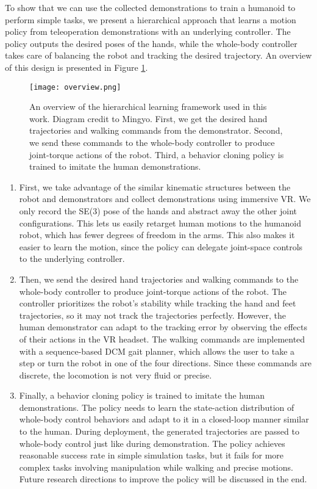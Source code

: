 To show that we can use the collected demonstrations to train a humanoid to perform simple tasks, we present a hierarchical approach that learns a motion policy from teleoperation demonstrations with an underlying controller. The policy outputs the desired poses of the hands, while the whole-body controller takes care of balancing the robot and tracking the desired trajectory. An overview of this design is presented in Figure \ref{fig:overview}.
\begin{figure}
    \centering
    \texttt{[image: overview.png]}
    \caption{An overview of the hierarchical learning framework used in this work. Diagram credit to Mingyo. First, we get the desired hand trajectories and walking commands from the demonstrator. Second, we send these commands to the whole-body controller to produce joint-torque actions of the robot. Third, a behavior cloning policy is trained to imitate the human demonstrations. }
    \label{fig:overview}
\end{figure}
\begin{enumerate}
    \item First, we take advantage of the similar kinematic structures between the robot and demonstrators and collect demonstrations using immersive VR. 
We only record the SE(3) pose of the hands and abstract away the other joint configurations. This lets us easily retarget human motions to the humanoid robot, which has fewer degrees of freedom in the arms. This also makes it easier to learn the motion, since the policy can delegate joint-space controls to the underlying controller. 
\item Then, we send the desired hand trajectories and walking commands to the whole-body controller to produce joint-torque actions of the robot. The controller prioritizes the robot's stability while tracking the hand and feet trajectories, so it may not track the trajectories perfectly. However, the human demonstrator can adapt to the tracking error by observing the effects of their actions in the VR headset. The walking commands are implemented with a sequence-based DCM gait planner, which allows the user to take a step or turn the robot in one of the four directions. Since these commands are discrete, the locomotion is not very fluid or precise. 
\item Finally, a behavior cloning policy is trained to imitate the human demonstrations. The policy needs to learn the state-action distribution of whole-body control behaviors and adapt to it in a closed-loop manner similar to the human. During deployment, the generated trajectories are passed to whole-body control just like during demonstration. The policy achieves reasonable success rate in simple simulation tasks, but it fails for more complex tasks involving manipulation while walking and precise motions. Future research directions to improve the policy will be discussed in the end. 
\end{enumerate}

